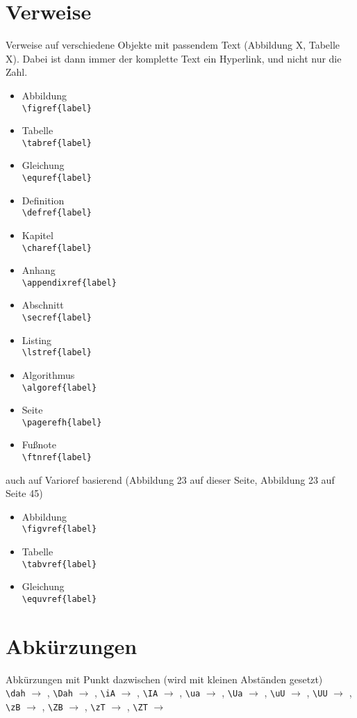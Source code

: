 \section*{Verweise}
Verweise auf verschiedene Objekte mit passendem Text (\glqq{}Abbildung X\grqq{}, \glqq{}Tabelle X\grqq{}).
Dabei ist dann immer der komplette Text ein Hyperlink, und nicht nur die Zahl.
\begin{itemize}
	\item Abbildung\\ \verb|\figref{label}|
	\item Tabelle\\ \verb|\tabref{label}|
	\item Gleichung\\ \verb|\equref{label}|
	\item Definition\\ \verb|\defref{label}|
	\item Kapitel\\ \verb|\charef{label}|
	\item Anhang\\ \verb|\appendixref{label}|
	\item Abschnitt\\ \verb|\secref{label}|
	\item Listing\\ \verb|\lstref{label}|
	\item Algorithmus\\ \verb|\algoref{label}|
	\item Seite\\ \verb|\pagerefh{label}|
	\item Fußnote\\ \verb|\ftnref{label}|
\end{itemize}

\ZT auch auf Varioref basierend (\glqq{}Abbildung 23 auf dieser Seite\grqq{}, \glqq{}Abbildung 23 auf Seite 45\grqq)
\begin{itemize}
	\item Abbildung\\ \verb|\figvref{label}|
	\item Tabelle\\ \verb|\tabvref{label}|
	\item Gleichung\\ \verb|\equvref{label}|
\end{itemize}


\section*{Abkürzungen}
Abkürzungen mit Punkt \glqq{}dazwischen\grqq{} (wird mit kleinen Abständen gesetzt)\\
\verb|\dah| $\rightarrow$ \dah, \verb|\Dah| $\rightarrow$ \Dah, \verb|\iA| $\rightarrow$ \iA, \verb|\IA| $\rightarrow$ \IA, \verb|\ua| $\rightarrow$ \ua, \verb|\Ua| $\rightarrow$ \Ua, \verb|\uU| $\rightarrow$ \uU, \verb|\UU| $\rightarrow$ \UU, \verb|\zB| $\rightarrow$ \zB, \verb|\ZB| $\rightarrow$ \ZB, \verb|\zT| $\rightarrow$ \zT, \verb|\ZT| $\rightarrow$ \ZT

